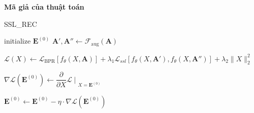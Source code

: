 \clearpage
\noindent \textbf{Mã giả của thuật toán}
\begin{algorithm}[H]
    \fontsize{14}{15}\selectfont
    \caption{SSL\_REC}
    \begin{algorithmic}[1]
            \State initialize $\mathbf{E}^{(0)}$
            \Repeat
                \State $\mathbf{A}', \mathbf{A}'' \gets \mathcal{F}_\text{aug}(\mathbf{A})$
                
                \vspace*{+3mm}
                \State $\mathcal{L}(X) \gets \mathcal{L}_\text{BPR}\left[f_\theta(X, \mathbf{A})\right] + \lambda_1 \mathcal{L}_\textit{ssl}\left[f_\theta(X, \mathbf{A}'), f_\theta(X, \mathbf{A}'')\right] + \lambda_2 \lVert X \lVert_2^2$
                
                \vspace*{+3mm}
                \State $\nabla \mathcal{L}(\mathbf{E}^{(0)}) \gets \dfrac{\partial}{\partial X}\mathcal{L} \; \Bigr|_{\substack{X = \mathbf{E}^{(0)}}}$

                \vspace*{+3mm}
                \State $\mathbf{E}^{(0)} \gets \mathbf{E}^{(0)} - \eta \cdot \nabla \mathcal{L}(\mathbf{E}^{(0)})$
        \EndProcedure
    \end{algorithmic}
\end{algorithm}

